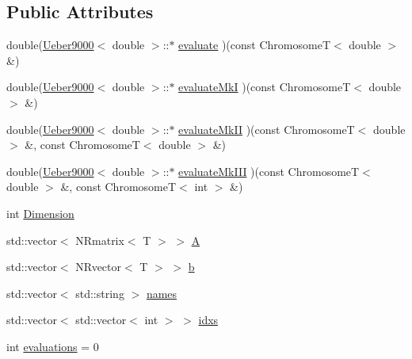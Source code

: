 \subsection*{\-Public \-Attributes}
\begin{DoxyCompactItemize}
\item 
double(\hyperlink{struct_p_r_p_s_evolution_1_1_solve_1_1_ueber9000}{\-Ueber9000}$<$ double $>$\-::$\ast$ \hyperlink{struct_p_r_p_s_evolution_1_1_solve_1_1_ueber9000_acc89aa4176099e0fe3633f396426d06b}{evaluate} )(const \-Chromosome\-T$<$ double $>$ \&)
\item 
double(\hyperlink{struct_p_r_p_s_evolution_1_1_solve_1_1_ueber9000}{\-Ueber9000}$<$ double $>$\-::$\ast$ \hyperlink{struct_p_r_p_s_evolution_1_1_solve_1_1_ueber9000_a0468bd48bc15e692e299435b0a2ecc9a}{evaluate\-Mk\-I} )(const \-Chromosome\-T$<$ double $>$ \&)
\item 
double(\hyperlink{struct_p_r_p_s_evolution_1_1_solve_1_1_ueber9000}{\-Ueber9000}$<$ double $>$\-::$\ast$ \hyperlink{struct_p_r_p_s_evolution_1_1_solve_1_1_ueber9000_aeb891e166bc342c173302b523e7b03dd}{evaluate\-Mk\-I\-I} )(const \-Chromosome\-T$<$ double $>$ \&, const \-Chromosome\-T$<$ double $>$ \&)
\item 
double(\hyperlink{struct_p_r_p_s_evolution_1_1_solve_1_1_ueber9000}{\-Ueber9000}$<$ double $>$\-::$\ast$ \hyperlink{struct_p_r_p_s_evolution_1_1_solve_1_1_ueber9000_af6f8d388aab7bab1737d2fa8eb479e14}{evaluate\-Mk\-I\-I\-I} )(const \-Chromosome\-T$<$ double $>$ \&, const \-Chromosome\-T$<$ int $>$ \&)
\item 
int \hyperlink{struct_p_r_p_s_evolution_1_1_solve_1_1_ueber9000_a9cf3886c2996dcd383d8f6c59384d885}{\-Dimension}
\item 
std\-::vector$<$ \-N\-Rmatrix$<$ \-T $>$ $>$ \hyperlink{struct_p_r_p_s_evolution_1_1_solve_1_1_ueber9000_a269888fd0617f5d4149957210b6a7ccc}{\-A}
\item 
std\-::vector$<$ \-N\-Rvector$<$ \-T $>$ $>$ \hyperlink{struct_p_r_p_s_evolution_1_1_solve_1_1_ueber9000_aef9c195d69ce0feec1f005062eaa7f79}{b}
\item 
std\-::vector$<$ std\-::string $>$ \hyperlink{struct_p_r_p_s_evolution_1_1_solve_1_1_ueber9000_aeeae8701a298a155f40159d87038acb1}{names}
\item 
std\-::vector$<$ std\-::vector$<$ int $>$ $>$ \hyperlink{struct_p_r_p_s_evolution_1_1_solve_1_1_ueber9000_a0742f16c54a3f01e756a84e2b714d571}{idxs}
\item 
int \hyperlink{struct_p_r_p_s_evolution_1_1_solve_1_1_ueber9000_a4fbe24b7462ad9fd46e6a97416b8d788}{evaluations} = 0
\end{DoxyCompactItemize}


